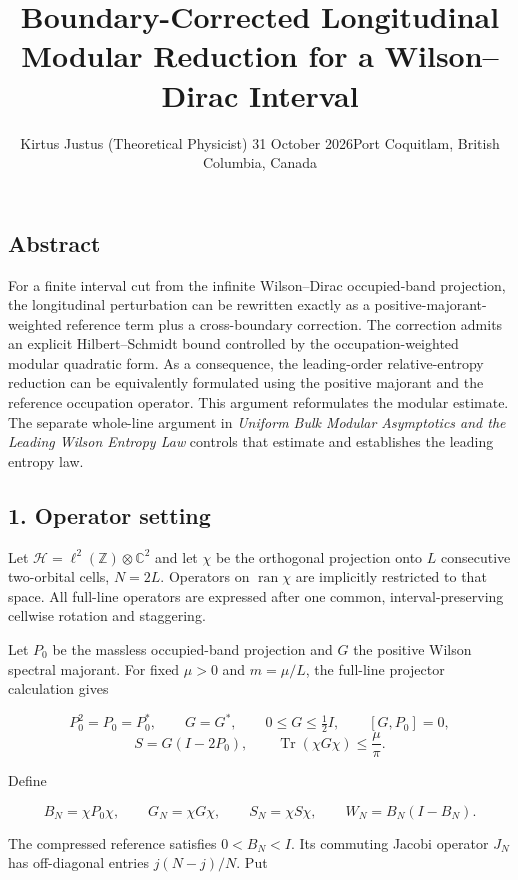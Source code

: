 \documentclass[
  10pt,
  a4paper,
]{article}
\title{Boundary-Corrected Longitudinal Modular Reduction for a Wilson--Dirac Interval}
\author{Kirtus Justus (Theoretical Physicist) \textbullet{} 31 October 2026\tabularnewline Port Coquitlam, British Columbia, Canada}
\date{}
\begin{document}
\maketitle

\subsection{Abstract}\label{abstract}

For a finite interval cut from the infinite Wilson--Dirac occupied-band projection, the longitudinal perturbation can be rewritten exactly as a positive-majorant-weighted reference term plus a cross-boundary correction. The correction admits an explicit Hilbert--Schmidt bound controlled by the occupation-weighted modular quadratic form. As a consequence, the leading-order relative-entropy reduction can be equivalently formulated using the positive majorant and the reference occupation operator. This argument reformulates the modular estimate. The separate whole-line argument in \emph{Uniform Bulk Modular Asymptotics and the Leading Wilson Entropy Law} controls that estimate and establishes the leading entropy law.

\subsection{1. Operator setting}\label{operator-setting}

Let \(\mathcal H=\ell^2(\mathbb Z)\otimes\mathbb C^2\) and let \(\chi\) be the orthogonal projection onto \(L\) consecutive two-orbital cells, \(N=2L\). Operators on \(\operatorname{ran}\chi\) are implicitly restricted to that space. All full-line operators are expressed after one common, interval-preserving cellwise rotation and staggering.

Let \(P_0\) be the massless occupied-band projection and \(G\) the positive Wilson spectral majorant. For fixed \(\mu>0\) and \(m=\mu/L\), the full-line projector calculation gives

\[
P_0^2=P_0=P_0^*,\qquad G=G^*,\qquad 0\le G\le\tfrac12 I,
\qquad [G,P_0]=0,
\] \[
S=G(I-2P_0),\qquad \operatorname{Tr}(\chi G\chi)\le\frac\mu\pi.
\tag{1}
\]

Define

\[
B_N=\chi P_0\chi,\qquad G_N=\chi G\chi,\qquad S_N=\chi S\chi,
\qquad W_N=B_N(I-B_N).
\tag{2}
\]

The compressed reference satisfies \(0<B_N<I\). Its commuting Jacobi operator \(J_N\) has off-diagonal entries \(j(N-j)/N\). Put
\end{document}
